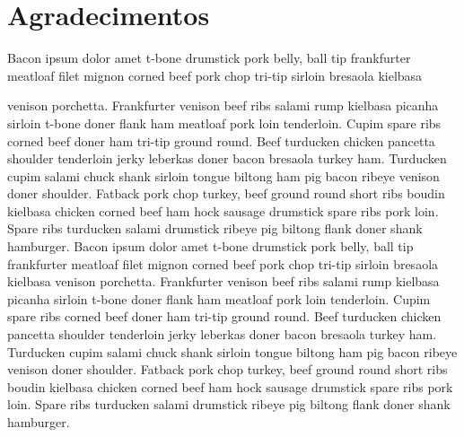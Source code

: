 \documentclass[a4paper,11pt,twocolumn]{article}
\begin{document}
\section*{Agradecimentos}
Bacon ipsum dolor amet t-bone drumstick pork belly, ball tip frankfurter meatloaf filet mignon corned beef pork chop tri-tip sirloin bresaola kielbasa

venison porchetta. Frankfurter venison beef ribs salami rump kielbasa picanha sirloin t-bone doner flank ham meatloaf pork loin tenderloin. Cupim spare ribs corned beef doner ham tri-tip ground round. Beef turducken chicken pancetta shoulder tenderloin jerky leberkas doner bacon bresaola turkey ham. Turducken cupim salami chuck shank sirloin tongue biltong ham pig bacon ribeye venison doner shoulder. Fatback pork chop turkey, beef ground round short ribs boudin kielbasa chicken corned beef ham hock sausage drumstick spare ribs pork loin. Spare ribs turducken salami drumstick ribeye pig biltong flank doner shank hamburger.
Bacon ipsum dolor amet t-bone drumstick pork belly, ball tip frankfurter meatloaf filet mignon corned beef pork chop tri-tip sirloin bresaola kielbasa venison porchetta. Frankfurter venison beef ribs salami rump kielbasa picanha sirloin t-bone doner flank ham meatloaf pork loin tenderloin. Cupim spare ribs corned beef doner ham tri-tip ground round. Beef turducken chicken pancetta shoulder tenderloin jerky leberkas doner bacon bresaola turkey ham. Turducken cupim salami chuck shank sirloin tongue biltong ham pig bacon ribeye venison doner shoulder. Fatback pork chop turkey, beef ground round short ribs boudin kielbasa chicken corned beef ham hock sausage drumstick spare ribs pork loin. Spare ribs turducken salami drumstick ribeye pig biltong flank doner shank hamburger.

 
\end{document}
